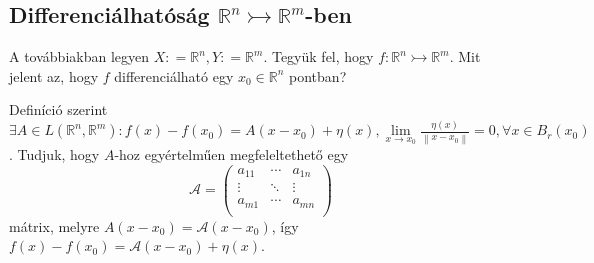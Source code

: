 \documentclass[12pt,a4paper]{scrartcl}
\begin{document}
\hypertarget{differencialhatosag-left.-mathbbrnrightarrowtailmathbbrm-right.-ben}{%
\subsection{\texorpdfstring{Differenciálhatóság
\(\left. {\mathbb{R}}^{n}\rightarrowtail{\mathbb{R}}^{m} \right.\)-ben}{Differenciálhatóság \textbackslash{}left. \{\textbackslash{}mathbb\{R\}\}\^{}\{n\}\textbackslash{}rightarrowtail\{\textbackslash{}mathbb\{R\}\}\^{}\{m\} \textbackslash{}right.-ben}}\label{differencialhatosag-left.-mathbbrnrightarrowtailmathbbrm-right.-ben}}

A továbbiakban legyen \(X: = {\mathbb{R}}^{n},Y: = {\mathbb{R}}^{m}\).
Tegyük fel, hogy
\(\left. f:{\mathbb{R}}^{n}\rightarrowtail{\mathbb{R}}^{m} \right.\).
Mit jelent az, hogy \(f\) differenciálható egy
\(x_{0} \in {\mathbb{R}}^{n}\) pontban?

Definíció szerint
\(\exists A \in L\left( {{\mathbb{R}}^{n},{\mathbb{R}}^{m}} \right):f\left( x \right) - f\left( x_{0} \right) = A\left( {x - x_{0}} \right) + \eta\left( x \right),\underset{x\rightarrow x_{0}}{\lim}\frac{\eta\left( x \right)}{\left\| {x - x_{0}} \right\|} = 0,\forall x \in B_{r}\left( x_{0} \right)\).
Tudjuk, hogy \(A\)-hoz egyértelműen megfeleltethető egy
\[\mathcal{A} = \left( \begin{array}{lll}
a_{11} & \cdots & a_{1n} \\
 \vdots & \ddots & \vdots \\
a_{m1} & \cdots & a_{mn} \\
\end{array} \right)\] mátrix, melyre
\(A\left( {x - x_{0}} \right) = \mathcal{A}\left( {x - x_{0}} \right)\),
így
\(f\left( x \right) - f\left( x_{0} \right) = \mathcal{A}\left( {x - x_{0}} \right) + \eta\left( x \right)\).
\end{document}
